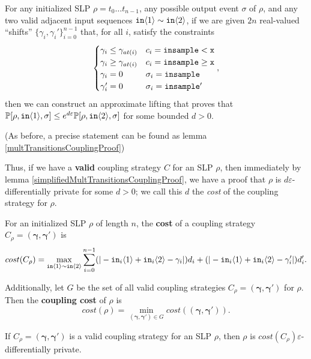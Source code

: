 \begin{lemma}\label{simplifiedMultTransitionsCouplingProof}
  For any initialized SLP $\rho = t_0\ldots t_{n-1}$, any possible output event $\sigma$ of $\rho$, and any two valid adjacent input sequences $\texttt{in}\brangle{1}\sim \texttt{in}\brangle{2}$, if we are given $2n$ real-valued ``shifts'' $\{\gamma_i, \gamma_i'\}_{i=0}^{n-1}$ that, for all $i$, satisfy the constraints \[
        \begin{cases}
          \gamma_i\leq\gamma_{at(i)} & c_i = \lguard[\texttt{x}]\\
          \gamma_i\geq\gamma_{at(i)} & c_i = \gguard[\texttt{x}]\\
          \gamma_i=0 & \sigma_i = \texttt{insample}\\
          \gamma_i'=0 & \sigma_i = \texttt{insample}'
        \end{cases},
      \]
      then we can construct an approximate lifting that proves that $\PP[\rho, \texttt{in}\brangle{1}, \sigma] \leq e^{d\varepsilon}\PP[\rho, \texttt{in}\brangle{2}, \sigma]$ for some bounded $d>0$. 
\end{lemma}

(As before, a precise statement can be found as lemma \ref{multTransitionsCouplingProof})

Thus, if we have a \textbf{valid} coupling strategy $C$ for an SLP $\rho$, then immediately by lemma \ref{simplifiedMultTransitionsCouplingProof}, we have a proof that $\rho$ is $d\varepsilon$-differentially private for some $d>0$; we call this $d$ the \textit{cost} of the coupling strategy for $\rho$. 

\begin{defn}
    For an initialized SLP $\rho$ of length $n$, the \textbf{cost} of a coupling strategy $C_\rho=(\bm{\gamma}, \bm{\gamma}')$ is \[cost(C_\rho) = \max_{\texttt{in}\brangle{1}\sim\texttt{in}\brangle{2}}\sum_{i=0}^{n-1}(|-\texttt{in}_i\brangle{1}+\texttt{in}_i\brangle{2}-\gamma_i|)d_i+(|-\texttt{in}_i\brangle{1}+\texttt{in}_i\brangle{2}-\gamma_i'|)d_i'.\]

    Additionally, let $G$ be the set of all valid coupling strategies $C_\rho=(\bm{\gamma}, \bm{\gamma}')$ for $\rho$. Then the \textbf{coupling cost} of $\rho$ is 
    \[cost(\rho) = \min_{(\bm{\gamma}, \bm{\gamma}')\in G}cost((\bm{\gamma}, \bm{\gamma}')).\]
\end{defn}

\begin{cor}\label{pathCostCor}
    If $C_\rho=(\bm{\gamma}, \bm{\gamma}')$ is a valid coupling strategy for an SLP $\rho$, then $\rho$ is $cost(C_\rho)\varepsilon$-differentially private.
\end{cor}

